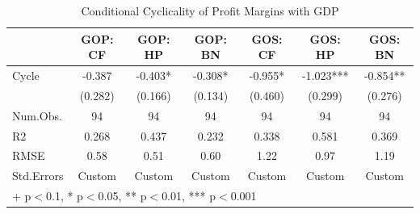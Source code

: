 \begin{table}[!htbp]
\centering
\caption{Conditional Cyclicality of Profit Margins with GDP}
\begin{tabular}{lcccccc}
\toprule
 & GOP: CF & GOP: HP & GOP: BN & GOS: CF & GOS: HP & GOS: BN \\
\midrule
Cycle & -0.387 & -0.403* & -0.308* & -0.955* & -1.023*** & -0.854** \\
 & (0.282) & (0.166) & (0.134) & (0.460) & (0.299) & (0.276) \\
\midrule
Num.Obs. & 94 & 94 & 94 & 94 & 94 & 94 \\
R2 & 0.268 & 0.437 & 0.232 & 0.338 & 0.581 & 0.369 \\
RMSE & 0.58 & 0.51 & 0.60 & 1.22 & 0.97 & 1.19 \\
Std.Errors & Custom & Custom & Custom & Custom & Custom & Custom \\
\bottomrule
\multicolumn{7}{l}{\footnotesize + p$<$0.1, * p$<$0.05, ** p$<$0.01, *** p$<$0.001} \\
\end{tabular}
\end{table}
